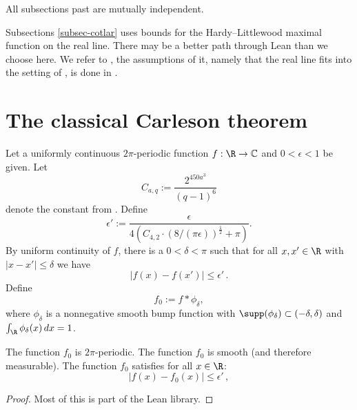 All subsections past  are mutually independent.

 Subsections \ref{subsec-cotlar} uses bounds for the Hardy--Littlewood maximal function on the real line. There may be a better path through Lean than we choose here.
 We refer to , the assumptions of it,
 namely that the real line fits into the setting of ,
 is done in .



\section{The classical Carleson theorem}
\label{10classical}

Let a uniformly continuous $2\pi$-periodic function $f:\R\to \mathbb{C}$ and $0<\epsilon<1$ be given.
Let
\begin{equation}
    C_{a,q} := \frac{2^{450a^3}}{(q-1)^6}
\end{equation}
denote the constant from .
Define
\begin{equation}
    \epsilon' := \frac \epsilon {4 (C_{4,2} \cdot (8 / (\pi\epsilon))^{\frac 1 2} + \pi)}.
\end{equation}
By uniform continuity of $f$, there is a $0<\delta<\pi$
such that for all $x,x' \in \R$ with $|x-x'|\le \delta$
we have
\begin{equation}\label{uniconbound}
|f(x)-f(x')|\le \epsilon' \, .
\end{equation}
Define
\begin{equation}\label{def-fzero}
f_0:=f \ast \phi_\delta,
\end{equation}
where $\phi_\delta$ is a nonnegative smooth bump function with $\supp (\phi_\delta) \subset (-\delta, \delta)$ and $\int _\R \phi_\delta (x) \, dx = 1$.

\begin{lemma}
    \label{smooth-approximation}
    \leanok
    The function $f_0$ is $2\pi$-periodic.
    The function $f_0$ is smooth (and therefore measurable).
    The function $f_0$ satisfies for all $x\in \R$:
    \begin{equation}\label{eq-ffzero}
    |f(x)-f_0(x)|\le \epsilon' \, ,
    \end{equation}
\end{lemma}

\begin{proof}
    \leanok
    Most of this is part of the Lean library.
\end{proof}

